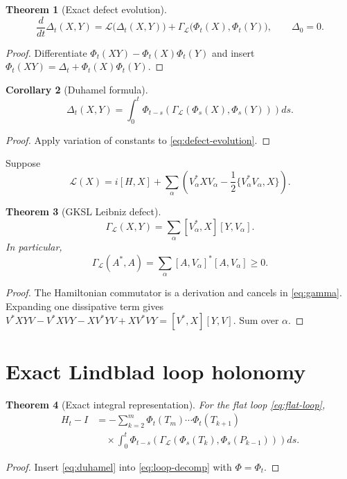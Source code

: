 \documentclass[11pt]{article}
\newtheorem{theorem}{Theorem}[section]
\newtheorem{corollary}[theorem]{Corollary}
\theoremstyle{definition}
\theoremstyle{remark}
\begin{document}
\begin{theorem}[Exact defect evolution]\label{thm:defect-evolution}
\begin{equation}\label{eq:defect-evolution}
\frac{d}{dt}\Delta_t(X,Y)
=\mathcal L\bigl(\Delta_t(X,Y)\bigr)
+\Gamma_{\mathcal L}\bigl(\Phi_t(X),\Phi_t(Y)\bigr),
\qquad \Delta_0=0.
\end{equation}
\end{theorem}
\begin{proof}
Differentiate $\Phi_t(XY)-\Phi_t(X)\Phi_t(Y)$ and insert $\Phi_t(XY)=\Delta_t+\Phi_t(X)\Phi_t(Y)$.
\end{proof}

\begin{corollary}[Duhamel formula]\label{cor:duhamel}
\begin{equation}\label{eq:duhamel}
\Delta_t(X,Y)
=\int_0^t \Phi_{t-s}\!\left(
\Gamma_{\mathcal L}(\Phi_s(X),\Phi_s(Y))
\right)ds.
\end{equation}
\end{corollary}
\begin{proof}
Apply variation of constants to \eqref{eq:defect-evolution}.
\end{proof}

Suppose
\begin{equation}\label{eq:gksl}
\mathcal L(X)=i[H,X]+\sum_\alpha\left(V_\alpha^*XV_\alpha-
\frac12\{V_\alpha^*V_\alpha,X\}\right).
\end{equation}

\begin{theorem}[GKSL Leibniz defect]\label{thm:gksl-gamma}
\begin{equation}\label{eq:gksl-gamma}
\Gamma_{\mathcal L}(X,Y)=\sum_\alpha[V_\alpha^*,X][Y,V_\alpha].
\end{equation}
In particular,
\begin{equation}\label{eq:positive-gamma}
\Gamma_{\mathcal L}(A^*,A)=\sum_\alpha[A,V_\alpha]^*[A,V_\alpha]\ge0.
\end{equation}
\end{theorem}
\begin{proof}
The Hamiltonian commutator is a derivation and cancels in \eqref{eq:gamma}. Expanding one dissipative term gives
$V^*XYV-V^*XVY-XV^*YV+XV^*VY=[V^*,X][Y,V]$. Sum over $\alpha$.
\end{proof}

\section{Exact Lindblad loop holonomy}
\begin{theorem}[Exact integral representation]\label{thm:lindblad-loop}
For the flat loop \eqref{eq:flat-loop},
\begin{align}\label{eq:lindblad-loop}
H_t-I
&=-\sum_{k=2}^{m}\Phi_t(T_m)\cdots\Phi_t(T_{k+1})\\
&\quad\times\int_0^t
\Phi_{t-s}\!\left(
\Gamma_{\mathcal L}(\Phi_s(T_k),\Phi_s(P_{k-1}))
\right)ds.
\nonumber
\end{align}
\end{theorem}
\begin{proof}
Insert \eqref{eq:duhamel} into \eqref{eq:loop-decomp} with $\Phi=\Phi_t$.
\end{proof}
\end{document}
